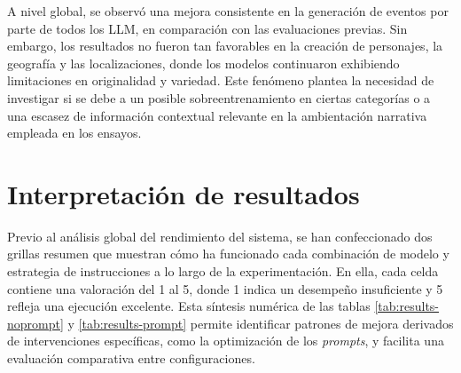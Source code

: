 A nivel global, se observó una mejora consistente en la generación de eventos por parte de todos los LLM,
en comparación con las evaluaciones previas.
Sin embargo, los resultados no fueron tan favorables en la creación de personajes,
la geografía y las localizaciones,
donde los modelos continuaron exhibiendo limitaciones en originalidad y variedad.
Este fenómeno plantea la necesidad de investigar si se debe a un posible sobreentrenamiento en ciertas categorías
o a una escasez de información contextual relevante en la ambientación narrativa empleada en los ensayos.

\section{Interpretación de resultados}
Previo al análisis global del rendimiento del sistema,
se han confeccionado dos grillas resumen que muestran cómo ha funcionado
cada combinación de modelo y estrategia de instrucciones a lo largo de la experimentación.
En ella, cada celda contiene una valoración del 1 al 5,
donde 1 indica un desempeño insuficiente y 5 refleja una ejecución excelente.
Esta síntesis numérica de las tablas \ref{tab:results-noprompt} y \ref{tab:results-prompt}
permite identificar patrones de mejora derivados
de intervenciones específicas, como la optimización de los \textit{prompts},
y facilita una evaluación comparativa entre configuraciones.
 
\begin{table}[h]
\centering
\caption{Tabla resumen de los ensayos con \textit{prompting} poco preciso.}
\label{tab:results-noprompt}
\end{table}

